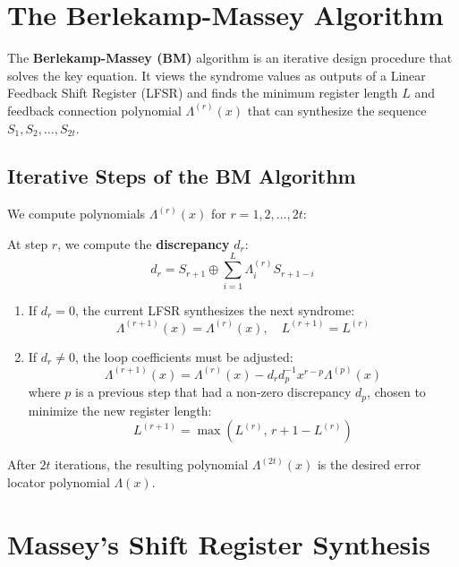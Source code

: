 \documentclass[12pt,a4paper]{article}
\begin{document}
\section{The Berlekamp-Massey Algorithm}

The \textbf{Berlekamp-Massey (BM)} algorithm is an iterative design procedure that solves the key equation. It views the syndrome values as outputs of a Linear Feedback Shift Register (LFSR) and finds the minimum register length $L$ and feedback connection polynomial $\Lambda^{(r)}(x)$ that can synthesize the sequence $S_1, S_2, \dots, S_{2t}$.

\subsection{Iterative Steps of the BM Algorithm}
We compute polynomials $\Lambda^{(r)}(x)$ for $r = 1, 2, \dots, 2t$:
\begin{tcolorbox}[formulabox, title={\textbf{Berlekamp-Massey Iteration}}]
At step $r$, we compute the \textbf{discrepancy} $d_r$:
\[ d_r = S_{r+1} \oplus \sum_{i=1}^L \Lambda_i^{(r)} S_{r+1-i} \]
\begin{enumerate}[leftmargin=*, itemsep=3pt, topsep=0pt]
  \item If $d_r = 0$, the current LFSR synthesizes the next syndrome:
    \[ \Lambda^{(r+1)}(x) = \Lambda^{(r)}(x), \quad L^{(r+1)} = L^{(r)} \]
  \item If $d_r \neq 0$, the loop coefficients must be adjusted:
    \[ \Lambda^{(r+1)}(x) = \Lambda^{(r)}(x) - d_r d_p^{-1} x^{r-p} \Lambda^{(p)}(x) \]
    where $p$ is a previous step that had a non-zero discrepancy $d_p$, chosen to minimize the new register length:
    \[ L^{(r+1)} = \max \left( L^{(r)}, \, r + 1 - L^{(r)} \right) \]
\end{enumerate}
\end{tcolorbox}
After $2t$ iterations, the resulting polynomial $\Lambda^{(2t)}(x)$ is the desired error locator polynomial $\Lambda(x)$.

\section{Massey's Shift Register Synthesis}
\end{document}
